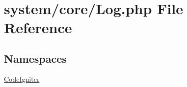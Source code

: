 \hypertarget{_log_8php}{}\section{system/core/\+Log.php File Reference}
\label{_log_8php}
\subsection*{Namespaces}
\begin{DoxyCompactItemize}
\item 
 \mbox{\hyperlink{namespace_code_igniter}{Code\+Igniter}}
\end{DoxyCompactItemize}

